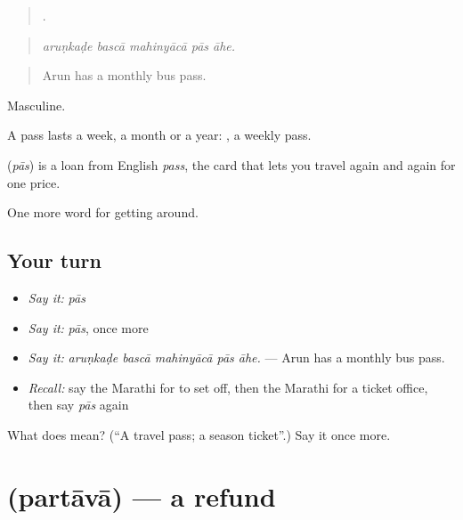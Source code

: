 \begin{quote}
    .
\end{quote}

\begin{quote}
\emph{aruṇkaḍe bascā mahinyācā pās āhe.}
\end{quote}

\begin{quote}
Arun has a monthly bus pass.
\end{quote}

Masculine.

A pass lasts a week, a month or a year:  , a weekly pass.

\begin{cousinweb}
\textbf{} (\emph{pās}) is a loan from English \emph{pass}, the card that lets you travel again and again for one price.
\end{cousinweb}

\begin{grammarlens}[title={What you've built}]
One more word for getting around.
\end{grammarlens}

\subsection*{Your turn}
\begin{itemize}
\raggedright
  \item \emph{Say it:} \emph{pās}
  \item \emph{Say it:} \emph{pās}, once more
  \item \emph{Say it:} \emph{aruṇkaḍe bascā mahinyācā pās āhe.} — Arun has a monthly bus pass.
  \item \emph{Recall:} say the Marathi for to set off, then the Marathi for a ticket office, then say \emph{pās} again
\end{itemize}

\begin{tcolorbox}[breakable,colback=teal!4,colframe=teal!35!black,title={Before you move on}]
What does  mean? (\textquotedblleft{}A travel pass; a season ticket\textquotedblright{}.) Say it once more.
\end{tcolorbox}
\section[\texorpdfstring{\mr{परतावा} (partāvā)}{परतावा (partāvā)}]{ (partāvā) — a refund}

